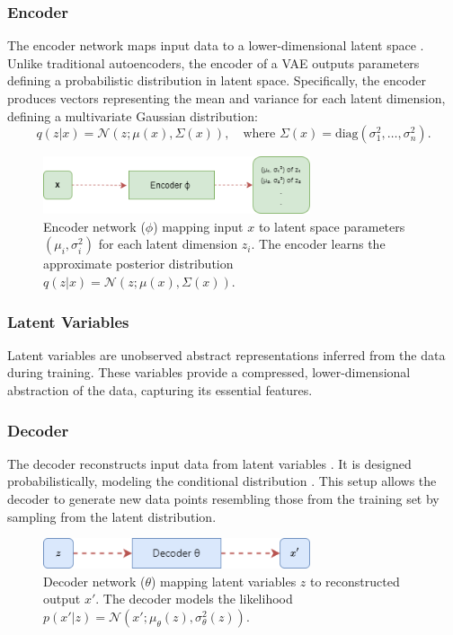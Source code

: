 \subsubsection{Encoder}
The encoder network maps input data  to a lower-dimensional latent space . Unlike traditional autoencoders, the encoder of a VAE outputs parameters defining a probabilistic distribution in latent space. Specifically, the encoder produces vectors representing the mean  and variance  for each latent dimension, defining a multivariate Gaussian distribution:
\begin{equation}
q(z|x) = \mathcal{N}(z; \mu(x), \Sigma(x)), \quad \text{where } \Sigma(x) = \text{diag}(\sigma_1^2, \dots, \sigma_n^2).
\end{equation}
\begin{figure}[htbp]
    \centering
    \includegraphics[width=0.7\textwidth]{img/vae/Image To Encoder To Latent Variable Parameters.png}
    \caption{Encoder network ($\phi$) mapping input $x$ to latent space parameters $(\mu_i, \sigma_i^2)$ for each latent dimension $z_i$. The encoder learns the approximate posterior distribution $q(z|x) = \mathcal{N}(z; \mu(x), \Sigma(x))$.}
    \label{fig:encoder}
\end{figure}

\subsubsection{Latent Variables}
Latent variables  are unobserved abstract representations inferred from the data during training. These variables provide a compressed, lower-dimensional abstraction of the data, capturing its essential features.

\subsubsection{Decoder}
The decoder reconstructs input data  from latent variables . It is designed probabilistically, modeling the conditional distribution . This setup allows the decoder to generate new data points resembling those from the training set by sampling from the latent distribution.
\begin{figure}[htbp]
    \centering
    \includegraphics[width=0.7\textwidth]{img/vae/decoder_figure.png}
    \caption{Decoder network ($\theta$) mapping latent variables $z$ to reconstructed output $x'$. The decoder models the likelihood $p(x'|z) = \mathcal{N}(x'; \mu_\theta(z), \sigma_\theta^2(z))$.}
    \label{fig:decoder}
\end{figure}


